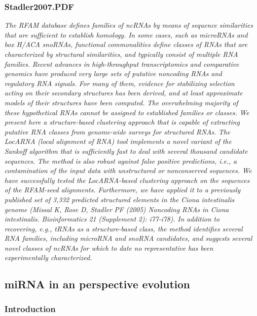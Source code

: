 \documentclass[graybox]{svmult}
\begin{document}
\subsubsection{Stadler2007.PDF}
\cite{Will2007}
\textit{The RFAM database defines families of ncRNAs by means of sequence similarities that are sufficient to establish homology. In some cases, such as microRNAs and box H/ACA snoRNAs, functional commonalities define classes of RNAs that are characterized by structural similarities, and typically consist of multiple RNA families. Recent advances in high-throughput transcriptomics and comparative genomics have produced very large sets of putative noncoding RNAs and regulatory RNA signals. For many of them, evidence for stabilizing selection acting on their secondary structures has been derived, and at least approximate models of their structures have been computed. The overwhelming majority of these hypothetical RNAs cannot be assigned to established families or classes. We present here a structure-based clustering approach that is capable of extracting putative RNA classes from genome-wide surveys for structured RNAs. The LocARNA (local alignment of RNA) tool implements a novel variant of the Sankoff algorithm that is sufficiently fast to deal with several thousand candidate sequences. The method is also robust against false positive predictions, i.e., a contamination of the input data with unstructured or nonconserved sequences. We have successfully tested the LocARNA-based clustering approach on the sequences of the RFAM-seed alignments. Furthermore, we have applied it to a previously published set of 3,332 predicted structured elements in the Ciona intestinalis genome (Missal K, Rose D, Stadler PF (2005) Noncoding RNAs in Ciona intestinalis. Bioinformatics 21 (Supplement 2): i77-i78). In addition to recovering, e.g., tRNAs as a structure-based class, the method identifies several RNA families, including microRNA and snoRNA candidates, and suggests several novel classes of ncRNAs for which to date no representative has been experimentally characterized.}

\subsection{miRNA in an perspective evolution}

\subsubsection{Introduction}
\end{document}
